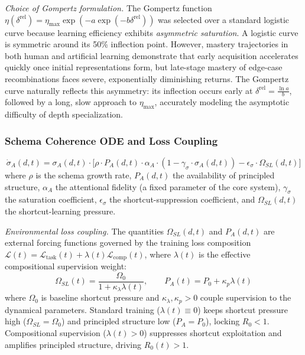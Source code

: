 \documentclass{article}
\theoremstyle{definition}
\begin{document}
\noindent\textit{Choice of Gompertz formulation.} The Gompertz function $\eta(\delta^{\text{rel}}) = \eta_{\max} \exp(-a \exp(-b \delta^{\text{rel}}))$ was selected over a standard logistic curve because learning efficiency exhibits \textit{asymmetric saturation}. A logistic curve is symmetric around its 50\% inflection point. However, mastery trajectories in both human and artificial learning demonstrate that early acquisition accelerates quickly once initial representations form, but late-stage mastery of edge-case recombinations faces severe, exponentially diminishing returns. The Gompertz curve naturally reflects this asymmetry: its inflection occurs early at $\delta^{\text{rel}} = \frac{\ln a}{b}$, followed by a long, slow approach to $\eta_{\max}$, accurately modeling the asymptotic difficulty of depth specialization.

\subsubsection{Schema Coherence ODE and Loss Coupling}
\begin{equation}\label{eq:sigma-ode}
\dot{\sigma}_A(d,t) = \sigma_A(d,t) \cdot \bigl[ \rho \cdot P_A(d,t) \cdot \alpha_A \cdot (1 - \gamma_{\sigma} \cdot \sigma_A(d,t)) - \epsilon_{\sigma} \cdot \Omega_{SL}(d,t) \bigr]
\end{equation}
where $\rho$ is the schema growth rate, $P_A(d,t)$ the availability of
principled structure, $\alpha_A$ the attentional fidelity (a fixed
parameter of the core system), $\gamma_\sigma$ the saturation coefficient, $\epsilon_\sigma$
the shortcut-suppression coefficient, and $\Omega_{SL}(d,t)$ the
shortcut-learning pressure.

\noindent\textit{Environmental loss coupling.} The quantities $\Omega_{SL}(d,t)$ and $P_A(d,t)$ are external forcing functions governed by the training loss composition $\mathcal{L}(t) = \mathcal{L}_{\text{task}}(t) + \lambda(t) \mathcal{L}_{\text{comp}}(t)$, where $\lambda(t)$ is the effective compositional supervision weight:
\begin{equation}\label{eq:loss-coupling}
\Omega_{SL}(t) = \frac{\Omega_0}{1 + \kappa_\lambda \lambda(t)}, \qquad P_A(t) = P_0 + \kappa_p \lambda(t)
\end{equation}
where $\Omega_0$ is baseline shortcut pressure and $\kappa_\lambda, \kappa_p > 0$ couple supervision to the dynamical parameters. Standard training ($\lambda(t) \equiv 0$) keeps shortcut pressure high ($\Omega_{SL} = \Omega_0$) and principled structure low ($P_A = P_0$), locking $R_0 < 1$. Compositional supervision ($\lambda(t) > 0$) suppresses shortcut exploitation and amplifies principled structure, driving $R_0(t) > 1$.
\end{document}

